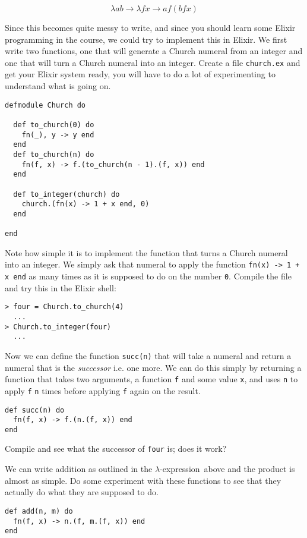 \documentclass[a4paper,11pt]{article}
\newcommand{\lame}[0]{$\lambda$-expression}
\begin{document}
$$\lambda a b \rightarrow \lambda f x \rightarrow a f (b f x)$$

Since this becomes quite messy to write, and since you should learn
some Elixir programming in the course, we could try to implement this
in Elixir. We first write two functions, one that will generate a
Church numeral from an integer and one that will turn a Church numeral
into an integer. Create a file {\tt church.ex} and get your Elixir
system ready, you will have to do a lot of experimenting to understand
what is going on.

\begin{verbatim}
defmodule Church do

  def to_church(0) do
    fn(_), y -> y end
  end
  def to_church(n) do
    fn(f, x) -> f.(to_church(n - 1).(f, x)) end
  end
  
  def to_integer(church) do
    church.(fn(x) -> 1 + x end, 0)
  end
  
end
\end{verbatim}

Note how simple it is to implement the function that turns a Church
numeral into an integer. We simply ask that numeral to apply the
function {\tt fn(x) -> 1 + x end} as many times as it is supposed to
do on the number {\tt 0}. Compile the file and try this in the Elixir shell:

\begin{verbatim}
> four = Church.to_church(4)
  ...
> Church.to_integer(four)
  ...
\end{verbatim}

Now we can define the function {\tt succ(n)} that will take a numeral
and return a numeral that is the {\em successor} i.e. one more. We
can do this simply by returning a function that takes two arguments, a
function {\tt f} and some value {\tt x}, and uses {\tt n} to apply {\tt f}
{\tt n} times before applying {\tt f} again on the result.

\begin{verbatim}
def succ(n) do
  fn(f, x) -> f.(n.(f, x)) end
end
\end{verbatim}

Compile and see what the successor of {\tt four} is; does it work?

We can write addition as outlined in the \lame\ above and the product
is almost as simple. Do some experiment with these functions to see
that they actually do what they are supposed to do.

\begin{verbatim}
def add(n, m) do
  fn(f, x) -> n.(f, m.(f, x)) end
end
\end{verbatim}
\end{document}
